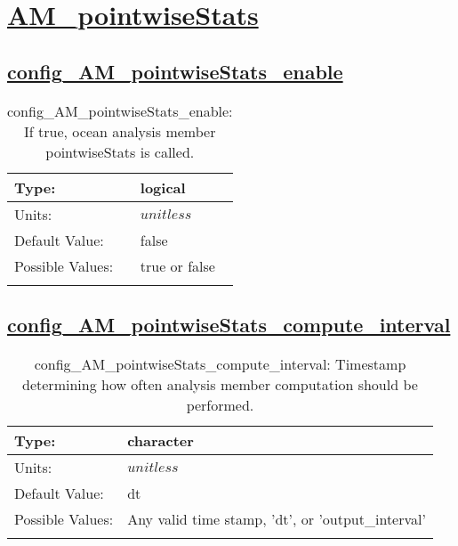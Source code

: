 \section[AM\_pointwiseStats]{\hyperref[sec:nm_tab_AM_pointwiseStats]{AM\_pointwiseStats}}
\label{sec:nm_sec_AM_pointwiseStats}
\subsection[config\_AM\_pointwiseStats\_enable]{\hyperref[sec:nm_tab_AM_pointwiseStats]{config\_AM\_pointwiseStats\_enable}}
\label{subsec:nm_sec_config_AM_pointwiseStats_enable}
\begin{center}
\begin{longtable}{| p{2.0in} || p{4.0in} |}
    \hline
    Type: & logical \\
    \hline
    Units: & $unitless$ \\
    \hline
    Default Value: & false \\
    \hline
    Possible Values: & true or false \\
    \hline
    \caption{config\_AM\_pointwiseStats\_enable: If true, ocean analysis member pointwiseStats is called.}
\end{longtable}
\end{center}
\subsection[config\_AM\_pointwiseStats\_compute\_interval]{\hyperref[sec:nm_tab_AM_pointwiseStats]{config\_AM\_pointwiseStats\_compute\_interval}}
\label{subsec:nm_sec_config_AM_pointwiseStats_compute_interval}
\begin{center}
\begin{longtable}{| p{2.0in} || p{4.0in} |}
    \hline
    Type: & character \\
    \hline
    Units: & $unitless$ \\
    \hline
    Default Value: & dt \\
    \hline
    Possible Values: & Any valid time stamp, 'dt', or 'output\_interval' \\
    \hline
    \caption{config\_AM\_pointwiseStats\_compute\_interval: Timestamp determining how often analysis member computation should be performed.}
\end{longtable}
\end{center}
